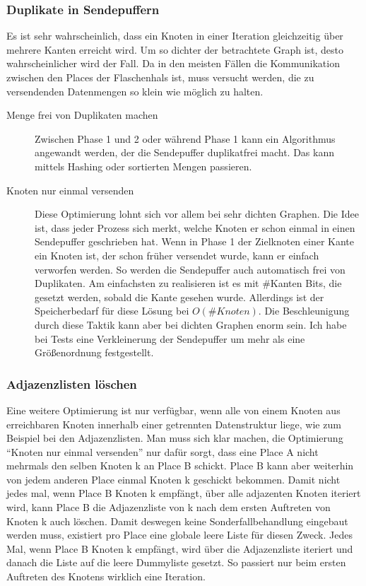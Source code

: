 \subsubsection{Duplikate in Sendepuffern} %
\label{sub:duplikate_in_sendepuffern}
Es ist sehr wahrscheinlich, dass ein Knoten in einer Iteration gleichzeitig über mehrere Kanten erreicht wird. Um so dichter der betrachtete Graph ist, desto wahrscheinlicher wird der Fall. Da in den meisten Fällen die Kommunikation zwischen den Places der Flaschenhals ist, muss versucht werden, die zu versendenden Datenmengen so klein wie möglich zu halten. 
\begin{description}
	\item[Menge frei von Duplikaten machen] Zwischen Phase 1 und 2 oder während Phase 1 kann ein Algorithmus angewandt werden, der die Sendepuffer duplikatfrei macht. Das kann mittels Hashing oder sortierten Mengen passieren.
	\item[Knoten nur einmal versenden] Diese Optimierung lohnt sich vor allem bei sehr dichten Graphen. Die Idee ist, dass jeder Prozess sich merkt, welche Knoten er schon einmal in einen Sendepuffer geschrieben hat. Wenn in Phase 1 der Zielknoten einer Kante ein Knoten ist, der schon früher versendet wurde, kann er einfach verworfen werden. So werden die Sendepuffer auch automatisch frei von Duplikaten. Am einfachsten zu realisieren ist es mit \#Kanten Bits, die gesetzt werden, sobald die Kante gesehen wurde. Allerdings ist der Speicherbedarf für diese Lösung bei $O(\# Knoten)$. Die Beschleunigung durch diese Taktik kann aber bei dichten Graphen enorm sein. Ich habe bei Tests eine Verkleinerung der Sendepuffer um mehr als eine Größenordnung festgestellt.
\end{description}

\subsubsection{Adjazenzlisten löschen} %
\label{ssub:adjazenslisten_löschen}
Eine weitere Optimierung ist nur verfügbar, wenn alle von einem Knoten aus erreichbaren Knoten innerhalb einer getrennten Datenstruktur liege, wie zum Beispiel bei den Adjazenzlisten. Man muss sich klar machen, die Optimierung \enquote{Knoten nur einmal versenden} nur dafür sorgt, dass eine Place A nicht mehrmals den selben Knoten k an Place B schickt. Place B kann aber weiterhin von jedem anderen Place einmal Knoten k geschickt bekommen. Damit nicht jedes mal, wenn Place B Knoten k empfängt, über alle adjazenten Knoten iteriert wird, kann Place B die Adjazenzliste von k nach dem ersten Auftreten von Knoten k auch löschen. Damit deswegen keine Sonderfallbehandlung eingebaut werden muss, existiert pro Place eine globale leere Liste für diesen Zweck. Jedes Mal, wenn Place B Knoten k empfängt, wird über die Adjazenzliste iteriert und danach die Liste auf die leere Dummyliste gesetzt. So passiert nur beim ersten Auftreten des Knotens wirklich eine Iteration. 

